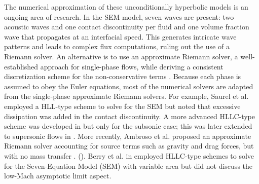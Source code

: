 \documentclass[preprint,10pt]{elsarticle}
\begin{document}
The numerical approximation of these unconditionally hyperbolic models is an ongoing area of research.
In the SEM model, seven waves are present: two acoustic waves and one contact discontinuity per fluid and one volume fraction wave that propagates 
at an interfacial speed. This generates intricate wave patterns and leads to complex flux computations, ruling out the use of a Riemann solver. 
An alternative is to use an approximate Riemann solver, a well-established approach for single-phase flows, while deriving a consistent discretization 
scheme for the non-conservative terms \cite{Li_2004,Abgrall_2002}. 
% 
Because each phase is assumed to obey the Euler equations, most of the numerical solvers are adapted from the single-phase approximate Riemann solvers. For example, Saurel et al. \cite{Saurel_2001a, Saurel_2001b} employed a HLL-type scheme to solve for the SEM but noted that excessive dissipation was added in the contact discontinuity. A more advanced HLLC-type scheme was developed in \cite{Li_2004} but only for the subsonic case; this was later extended to supersonic flows in \cite{Zein_2010}. More recently, Ambroso et al. \cite{Ambroso_2012} proposed an approximate Riemann solver accounting for source terms such as gravity and drag forces, but with no mass transfer .  (). 
Berry et al. in \cite{Berry_NED2010} employed HLLC-type schemes to solve for the Seven-Equation Model (SEM) with variable area but did not discuss the low-Mach asymptotic limit aspect.
\end{document}
